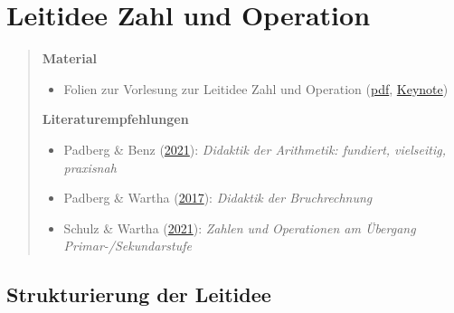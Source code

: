 \documentclass[
]{scrbook}
\providecommand{\tightlist}{%
  \setlength{\itemsep}{0pt}\setlength{\parskip}{0pt}}
\theoremstyle{definition}
\theoremstyle{definition}
\theoremstyle{definition}
\theoremstyle{definition}
\theoremstyle{remark}
\begin{document}
\hypertarget{leitidee-zahl-und-operation}{%
\chapter{Leitidee Zahl und Operation}\label{leitidee-zahl-und-operation}}

\begin{quote}
\textbf{Material}

\begin{itemize}
\tightlist
\item
  Folien zur Vorlesung zur Leitidee Zahl und Operation (\href{files/Stoffdidaktik-WiSe2223-Kap10.pdf}{pdf}, \href{files/Stoffdidaktik-WiSe2223-Kap10.key}{Keynote})
\end{itemize}

\textbf{Literaturempfehlungen}

\begin{itemize}
\tightlist
\item
  Padberg \& Benz (\protect\hyperlink{ref-Padberg2021}{2021}): \emph{Didaktik der Arithmetik: fundiert, vielseitig, praxisnah}
\item
  Padberg \& Wartha (\protect\hyperlink{ref-Padberg:2017}{2017}): \emph{Didaktik der Bruchrechnung}
\item
  Schulz \& Wartha (\protect\hyperlink{ref-Schulz2021}{2021}): \emph{Zahlen und Operationen am Übergang Primar-/Sekundarstufe}
\end{itemize}
\end{quote}

\hypertarget{strukturierung-der-leitidee-zahl-und-operation}{%
\section{Strukturierung der Leitidee}\label{strukturierung-der-leitidee-zahl-und-operation}}
\end{document}
